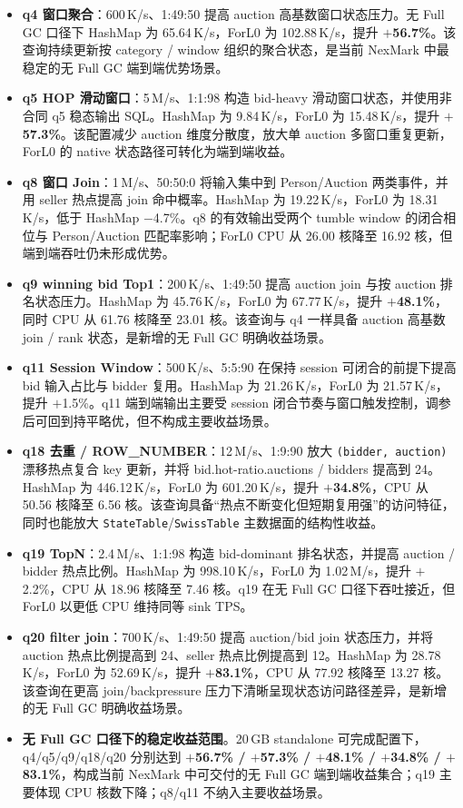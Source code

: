 \documentclass[a4paper,11pt]{article}
\begin{document}
\begin{itemize}
  \item \textbf{q4 窗口聚合}：600\,K/s、1:49:50 提高 auction 高基数窗口状态压力。无 Full GC 口径下 HashMap 为 65.64\,K/s，ForL0 为 102.88\,K/s，提升 \textbf{$+$56.7\%}。该查询持续更新按 category / window 组织的聚合状态，是当前 NexMark 中最稳定的无 Full GC 端到端优势场景。
  \item \textbf{q5 HOP 滑动窗口}：5\,M/s、1:1:98 构造 bid-heavy 滑动窗口状态，并使用非合同 q5 稳态输出 SQL。HashMap 为 9.84\,K/s，ForL0 为 15.48\,K/s，提升 \textbf{$+$57.3\%}。该配置减少 auction 维度分散度，放大单 auction 多窗口重复更新，ForL0 的 native 状态路径可转化为端到端收益。
  \item \textbf{q8 窗口 Join}：1\,M/s、50:50:0 将输入集中到 Person/Auction 两类事件，并用 seller 热点提高 join 命中概率。HashMap 为 19.22\,K/s，ForL0 为 18.31\,K/s，低于 HashMap $-$4.7\%。q8 的有效输出受两个 tumble window 的闭合相位与 Person/Auction 匹配率影响；ForL0 CPU 从 26.00 核降至 16.92 核，但端到端吞吐仍未形成优势。
  \item \textbf{q9 winning bid Top1}：200\,K/s、1:49:50 提高 auction join 与按 auction 排名状态压力。HashMap 为 45.76\,K/s，ForL0 为 67.77\,K/s，提升 \textbf{$+$48.1\%}，同时 CPU 从 61.76 核降至 23.01 核。该查询与 q4 一样具备 auction 高基数 join / rank 状态，是新增的无 Full GC 明确收益场景。
  \item \textbf{q11 Session Window}：500\,K/s、5:5:90 在保持 session 可闭合的前提下提高 bid 输入占比与 bidder 复用。HashMap 为 21.26\,K/s，ForL0 为 21.57\,K/s，提升 $+$1.5\%。q11 端到端输出主要受 session 闭合节奏与窗口触发控制，调参后可回到持平略优，但不构成主要收益场景。
  \item \textbf{q18 去重 / ROW\_NUMBER}：12\,M/s、1:9:90 放大 \texttt{(bidder, auction)} 漂移热点复合 key 更新，并将 bid.hot-ratio.auctions / bidders 提高到 24。HashMap 为 446.12\,K/s，ForL0 为 601.20\,K/s，提升 \textbf{$+$34.8\%}，CPU 从 50.56 核降至 6.56 核。该查询具备“热点不断变化但短期复用强”的访问特征，同时也能放大 \texttt{StateTable}/\texttt{SwissTable} 主数据面的结构性收益。
  \item \textbf{q19 TopN}：2.4\,M/s、1:1:98 构造 bid-dominant 排名状态，并提高 auction / bidder 热点比例。HashMap 为 998.10\,K/s，ForL0 为 1.02\,M/s，提升 $+$2.2\%，CPU 从 18.96 核降至 7.46 核。q19 在无 Full GC 口径下吞吐接近，但 ForL0 以更低 CPU 维持同等 sink TPS。
  \item \textbf{q20 filter join}：700\,K/s、1:49:50 提高 auction/bid join 状态压力，并将 auction 热点比例提高到 24、seller 热点比例提高到 12。HashMap 为 28.78\,K/s，ForL0 为 52.69\,K/s，提升 \textbf{$+$83.1\%}，CPU 从 77.92 核降至 13.27 核。该查询在更高 join/backpressure 压力下清晰呈现状态访问路径差异，是新增的无 Full GC 明确收益场景。
  \item \textbf{无 Full GC 口径下的稳定收益范围}。20\,GB standalone 可完成配置下，q4/q5/q9/q18/q20 分别达到 \textbf{$+$56.7\% / $+$57.3\% / $+$48.1\% / $+$34.8\% / $+$83.1\%}，构成当前 NexMark 中可交付的无 Full GC 端到端收益集合；q19 主要体现 CPU 核数下降；q8/q11 不纳入主要收益场景。
\end{itemize}
\end{document}
